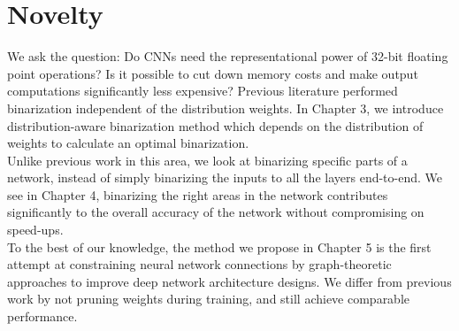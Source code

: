 \section{Novelty}

\noindent We  ask  the question:  Do  CNNs  need  the  representational power of 32-bit floating point operations? Is it possible to cut down memory costs and make output computations significantly less expensive? Previous literature performed binarization independent of the distribution weights. In Chapter 3, we introduce distribution-aware binarization method which depends on the distribution of weights to calculate an optimal binarization.\\

\noindent Unlike previous work in this area, we look at binarizing specific parts of a network, instead of simply binarizing the inputs to all the layers end-to-end. We see in Chapter 4, binarizing the right areas in the network contributes significantly to the overall accuracy of the network without compromising on speed-ups.\\

\noindent To the best of our knowledge, the method we propose in Chapter 5 is the first attempt at constraining neural network connections by graph-theoretic approaches to improve deep network architecture designs. We differ from previous work by not pruning weights during training, and still achieve comparable performance.
